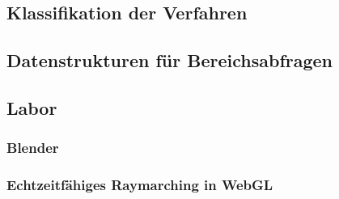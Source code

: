 \subsection{Klassifikation der Verfahren}

\subsection{Datenstrukturen für Bereichsabfragen}


\subsection{Labor}
\subsubsection{Blender}
\subsubsection{Echtzeitfähiges Raymarching in WebGL}
